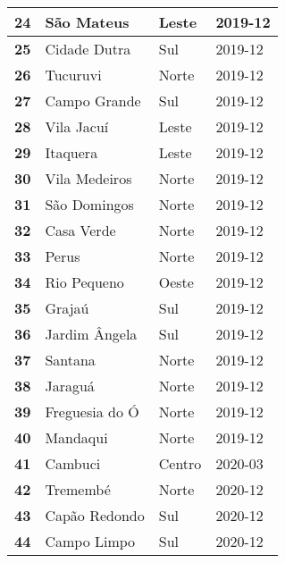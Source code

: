 \begin{table}[H]
\begin{tabular}{l|l|l|l}
	\textbf{24} & São Mateus & Leste & 2019-12\\ \hline
	\textbf{25} & Cidade Dutra & Sul & 2019-12\\ \hline
	\textbf{26} & Tucuruvi & Norte & 2019-12\\ \hline
	\textbf{27} & Campo Grande & Sul & 2019-12\\ \hline
	\textbf{28} & Vila Jacuí & Leste & 2019-12\\ \hline
	\textbf{29} & Itaquera & Leste & 2019-12\\ \hline
	\textbf{30} & Vila Medeiros & Norte & 2019-12\\ \hline
	\textbf{31} & São Domingos & Norte & 2019-12\\ \hline
	\textbf{32} & Casa Verde & Norte & 2019-12\\ \hline
	\textbf{33} & Perus & Norte & 2019-12\\ \hline
	\textbf{34} & Rio Pequeno & Oeste & 2019-12\\ \hline
	\textbf{35} & Grajaú & Sul & 2019-12\\ \hline
	\textbf{36} & Jardim Ângela & Sul & 2019-12\\ \hline
	\textbf{37} & Santana & Norte & 2019-12\\ \hline
	\textbf{38} & Jaraguá & Norte & 2019-12\\ \hline
	\textbf{39} & Freguesia do Ó & Norte & 2019-12\\ \hline
	\textbf{40} & Mandaqui & Norte & 2019-12\\ \hline
	\textbf{41} & Cambuci & Centro & 2020-03\\ \hline
	\textbf{42} & Tremembé & Norte & 2020-12\\ \hline
	\textbf{43} & Capão Redondo & Sul & 2020-12\\ \hline
	\textbf{44} & Campo Limpo & Sul & 2020-12\\	
	\end{tabular}
\end{table}


